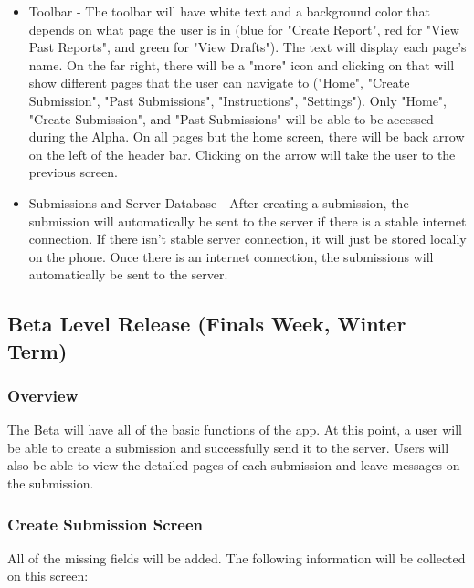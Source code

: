 \documentclass[onecolumn, draftclsnofoot,10pt, compsoc]{IEEEtran}
\begin{document}
\begin{itemize}
\item Toolbar - The toolbar will have white text and a background color that depends on what page the user is in (blue for "Create Report", red for "View Past Reports", and green for "View Drafts"). The text will display each page's name. On the far right, there will be a "more" icon and clicking on that will show different pages that the user can navigate to ("Home", "Create Submission", "Past Submissions", "Instructions", "Settings"). Only "Home", "Create Submission", and "Past Submissions" will be able to be accessed during the Alpha. On all pages but the home screen, there will be back arrow on the left of the header bar. Clicking on the arrow will take the user to the previous screen.

\item Submissions and Server Database - After creating a submission, the submission will automatically be sent to the server if there is a stable internet connection. If there isn't stable server connection, it will just be stored locally on the phone. Once there is an internet connection, the submissions will automatically be sent to the server.

\end{itemize}

\subsection{Beta Level Release (Finals Week, Winter Term)}
\subsubsection{Overview}
The Beta will have all of the basic functions of the app. At this point, a user will be able to create a submission and successfully send it to the server. Users will also be able to view the detailed pages of each submission and leave messages on the submission. 

\subsubsection{Create Submission Screen}
All of the missing fields will be added. The following information will be collected on this screen: 
\end{document}
